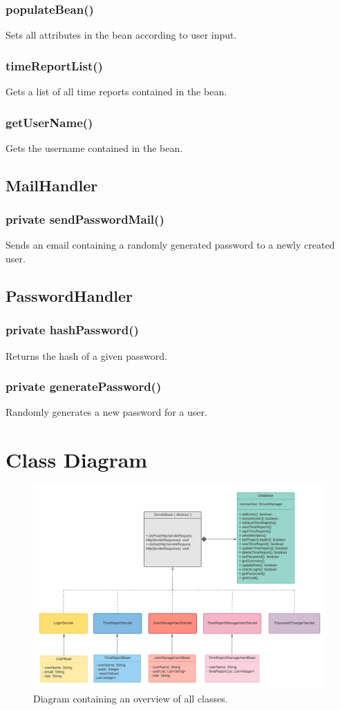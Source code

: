 \documentclass{article}
\begin{document}
\subsubsection{populateBean()}
Sets all attributes in the bean according to user input.
\subsubsection{timeReportList()}
Gets a list of all time reports contained in the bean.
\subsubsection{getUserName()}
Gets the username contained in the bean.

\subsection{MailHandler}
\subsubsection{private sendPasswordMail()}
Sends an email containing a randomly generated password to a newly created user.
\subsection{PasswordHandler}
\subsubsection{private hashPassword()}
Returns the hash of a given password.
\subsubsection{private generatePassword()}
Randomly generates a new password for a user.

\section{Class Diagram}

\begin{figure}[H]
    \centering
    \includegraphics[scale=0.5]{images/ClassDiagram.png}
    \caption{Diagram containing an overview of all classes.}
    \label{fig:classDiagram}
\end{figure}
\end{document}
